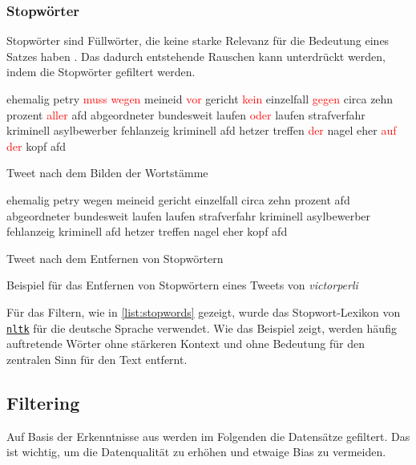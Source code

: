 \subsubsection{Stopwörter}


Stopwörter sind Füllwörter, die keine starke Relevanz für die Bedeutung eines Satzes haben \autocite[4]{kowsari_text_2019}. Das dadurch entstehende Rauschen kann unterdrückt werden, indem die Stopwörter gefiltert werden.


\begin{code}[H]
    \begin{subcode}{0.45\textwidth}
        \small
        ehemalig petry \textcolor{red}{muss wegen} meineid \textcolor{red}{vor} gericht \textcolor{red}{kein} einzelfall \textcolor{red}{gegen} circa zehn prozent \textcolor{red}{aller} afd abgeordneter bundesweit laufen \textcolor{red}{oder} laufen strafverfahr kriminell asylbewerber fehlanzeig kriminell afd hetzer treffen \textcolor{red}{der} nagel eher \textcolor{red}{auf der} kopf afd
        \caption{Tweet nach dem Bilden der Wortstämme}
    \end{subcode}\hfill
    \begin{subcode}{0.45\textwidth}
        \small
        ehemalig petry wegen meineid gericht einzelfall circa zehn prozent afd abgeordneter bundesweit laufen laufen strafverfahr kriminell asylbewerber fehlanzeig kriminell afd hetzer treffen nagel eher kopf afd
        \caption{Tweet nach dem Entfernen von Stopwörtern}
    \end{subcode}\hfill
    \caption[Beispiel -- Entfernen von Stopwörtern]{Beispiel für das Entfernen von Stopwörtern eines Tweets von \textit{victorperli}} \label{list:stopwords}
\end{code}

Für das Filtern, wie in \autoref{list:stopwords} gezeigt, wurde das Stopwort-Lexikon von \href{https://www.nltk.org/}{\texttt{nltk}} für die deutsche Sprache verwendet. Wie das Beispiel zeigt, werden häufig auftretende Wörter ohne stärkeren Kontext und ohne Bedeutung für den zentralen Sinn für den Text entfernt.

\subsection{Filtering} \label{subsec:filtering}

Auf Basis der Erkenntnisse aus  werden im Folgenden die Datensätze gefiltert. Das ist wichtig, um die Datenqualität zu erhöhen und etwaige Bias zu vermeiden.

